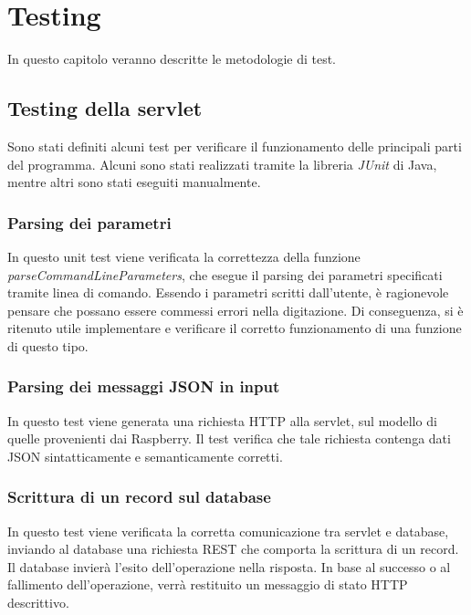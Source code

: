 \chapter{Testing}

In questo capitolo veranno descritte le metodologie di test.

\section{Testing della servlet}
Sono stati definiti alcuni test per verificare il funzionamento delle principali parti del programma.
Alcuni sono stati realizzati tramite la libreria \textit{JUnit} di Java, mentre altri sono stati eseguiti manualmente.

\subsection{Parsing dei parametri}
In questo unit test viene verificata la correttezza della funzione \textit{parseCommandLineParameters}, che esegue il parsing dei parametri specificati tramite linea di comando.
Essendo i parametri scritti dall'utente, è ragionevole pensare che possano essere commessi errori nella digitazione.
Di conseguenza, si è ritenuto utile implementare e verificare il corretto funzionamento di una funzione di questo tipo.

\subsection{Parsing dei messaggi JSON in input}
In questo test viene generata una richiesta HTTP alla servlet, sul modello di quelle provenienti dai Raspberry. Il test verifica che tale richiesta contenga dati JSON sintatticamente e semanticamente corretti.

\subsection{Scrittura di un record sul database}
In questo test viene verificata la corretta comunicazione tra servlet e database, inviando al database una richiesta REST che comporta la scrittura di un record.
Il database invierà l'esito dell'operazione nella risposta. In base al successo o al fallimento dell'operazione, verrà restituito un messaggio di stato HTTP descrittivo.

